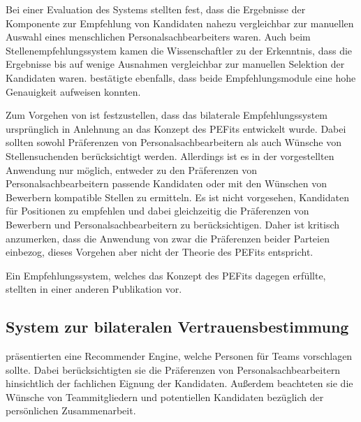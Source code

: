 Bei einer Evaluation des Systems stellten \textcite[S. 6f.]{malinowski:2006} fest, dass die Ergebnisse der Komponente zur Empfehlung von Kandidaten nahezu vergleichbar zur manuellen Auswahl eines menschlichen Personalsachbearbeiters waren. Auch beim Stellenempfehlungssystem kamen die Wissenschaftler zu der Erkenntnis, dass die Ergebnisse bis auf wenige Ausnahmen vergleichbar zur manuellen Selektion der Kandidaten waren. \textcite[S. 7]{keim:2007} bestätigte ebenfalls, dass beide Empfehlungsmodule eine hohe Genauigkeit aufweisen konnten.

Zum Vorgehen von \textcite[S. 3ff.]{malinowski:2006} ist festzustellen, dass das bilaterale Empfehlungssystem ursprünglich in Anlehnung an das Konzept des \acp{PEFit} entwickelt wurde. Dabei sollten sowohl Präferenzen von Personalsachbearbeitern als auch Wünsche von Stellensuchenden berücksichtigt werden. Allerdings ist es in der vorgestellten Anwendung nur möglich, entweder zu den Präferenzen von Personalsachbearbeitern passende Kandidaten oder mit den Wünschen von Bewerbern kompatible Stellen zu ermitteln. Es ist nicht vorgesehen, Kandidaten für Positionen zu empfehlen und dabei gleichzeitig die Präferenzen von Bewerbern und Personalsachbearbeitern zu berücksichtigen. Daher ist kritisch anzumerken, dass die Anwendung von \textcite[S. 3ff.]{malinowski:2006} zwar die Präferenzen beider Parteien einbezog, dieses Vorgehen aber nicht der Theorie des \acp{PEFit} entspricht.

Ein Empfehlungssystem, welches das Konzept des \acp{PEFit} dagegen erfüllte, stellten \textcite[S. 1ff.]{malinowski:2005} in einer anderen Publikation vor.

\subsection{System zur bilateralen Vertrauensbestimmung}
\label{ch:verwandteArbeiten:aufDemPEFitBasierendeBilateraleSysteme:bilateraleVertrauensbestimmung}
\textcite[S. 1]{malinowski:2005} präsentierten eine Recommender Engine, welche Personen für Teams vorschlagen sollte. Dabei berücksichtigten sie die Präferenzen von Personalsachbearbeitern hinsichtlich der fachlichen Eignung der Kandidaten. Außerdem beachteten sie die Wünsche von Teammitgliedern und potentiellen Kandidaten bezüglich der persönlichen Zusammenarbeit.

